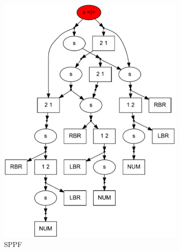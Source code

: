 \documentclass{sig-alternate} %
\begin{document}
\begin{figure}[ht]
    \begin{center}
    \centering
    \begin{subfigure}[b]{0.3\textwidth}
        \includegraphics[width=\textwidth]{dot/Brackets.pdf}
        \caption{SPPF}
        \label{sppf}        
    \end{subfigure}
    ~
    \begin{subfigure}[b]{0.3\textwidth}

\end{subfigure}
\end{center}
\end{figure}
\end{document}
